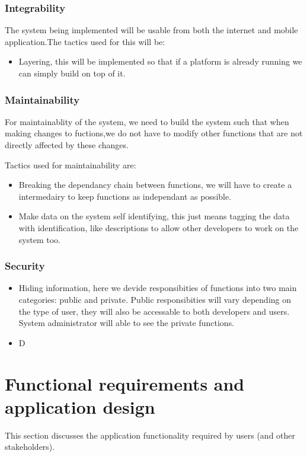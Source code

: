 \documentclass[a4paper,12pt]{report}
\begin{document}
\subsubsection{Integrability}

The system being implemented will be usable from both the internet and mobile application.The tactics used for this will be:
\begin{itemize}
\item Layering, this will be implemented so that if a platform is already running we can simply build on top of it.
\end{itemize}

\subsubsection{Maintainability}

For maintainablity of the system, we need to build the system such that when making changes to fuctions,we do not have to modify other functions that are not directly affected by these changes.

Tactics used for maintainability are:

\begin{itemize}
\item Breaking the dependancy chain between functions, we will have to create a intermedairy to keep functions as independant as possible.

\item Make data on the system self identifying, this just means tagging the data with identification, like descriptions to allow other developers to work on the system too.
\end{itemize}
\subsubsection{Security}

\begin{itemize}
\item Hiding information, here we devide responsibities of functions into two main categories: public and private. Public responsibities will vary depending on the type of user, they will also be accessable to both developers and users. System administrator will able to see the private functions.

\item D 
\end{itemize}


\newpage
\section{Functional requirements and application design}
This section discusses the application functionality required by users (and other stakeholders).
\end{document}
